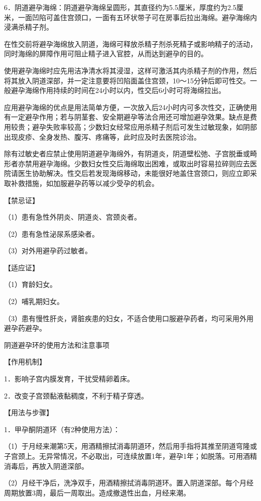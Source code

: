 \documentclass[12pt,UTF8]{ctexbook}
\begin{document}
6．阴道避孕海绵：阴道避孕海绵呈圆形，其直径约为5.5厘米，厚度约为2.5厘米，一面凹陷可盖住宫颈口，一面有五环状带子可在房事后拉出海绵。避孕海绵内浸满杀精子剂。

在性交前将避孕海绵放入阴道，海绵可释放杀精子剂杀死精子或影响精子的活动，同时海绵的屏障作用可阻止精子进入官腔，从而达到避孕的目的。

使用避孕海绵时应先用洁净清水将其浸湿，这样可激活其内杀精子剂的作用，然后将其放入阴道深部，并一定注意要将凹陷面盖住宫颈，10～15分钟后即可性交。一般避孕海绵作用持续的时间在24小时以内，性交后6小时可将海绵拉出。

应用避孕海绵的优点是用法简单方便，一次放入后24小时内可多次性交，正确使用有一定避孕作用；若与阴茎套、安全期避孕等法合用还可增加避孕效果。缺点是费用较贵；避孕失败率较高；少数妇女经常应用杀精子剂后可发生过敏现象，如阴部出现皮疹、全身发热、腹泻、疼痛等，此时应及时去医院诊治。

除有过敏史者应禁止使用阴道避孕海绵外，有阴道炎，阴道壁松弛、子宫脱垂或畸形者亦禁用避孕海绵。少数妇女性交后海绵取出困难，或取出时容易拉碎则应去医院请医生协助解决。性交后若发现海绵移动，未能很好地盖住宫颈口，则应立即采取补救措施，如加服避孕药等以减少受孕的机会。

【禁忌证】

（1）患有急性外阴炎、阴道炎、宫颈炎者。

（2）患有急性泌尿系感染者。

（3）对外用避孕药过敏者。

【适应证】

（1）育龄妇女。

（2）哺乳期妇女。

（3）患有慢性肝炎，肾脏疾患的妇女，不适合使用口服避孕药者，均可采用外用避孕药避孕。





阴道避孕环的使用方法和注意事项


【作用机制】

1．影响子宫内膜发育，干扰受精卵着床。

2．改变子宫颈黏液黏稠度，不利于精子穿透。

【用法与步骤】

1．甲孕酮阴道环（有2种使用方法）：

（1）于月经来潮第5天，用酒精擦拭消毒阴道环，然后用手指将其推至阴道穹隆或子宫颈上。无异常情况，不必取出，可连续放置1年，避孕1年；如脱落。可用酒精消毒后，再放入阴道深部。

（2）月经干净后，洗净双手，用酒精擦拭消毒阴道环。置入阴道深部。每个月经周期放置3周，最后一周取出。造成撤退性出血，月经来潮。
\end{document}
